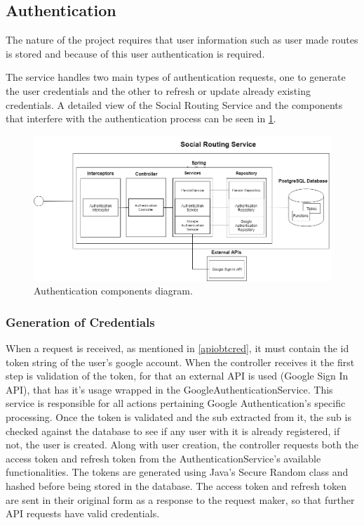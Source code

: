     \subsection{Authentication}

    The nature of the project requires that user information such as user made routes is stored and
    because of this user authentication is required.  

    The service handles two main types of authentication requests, one to generate the user credentials and the other to refresh or update
    already existing credentials. A detailed view of the Social Routing Service and the components that interfere with the authentication process can be seen 
    in \ref{fig:serviceauth}.
    
    \begin{figure}[ht]            
        \includegraphics[width=\textwidth]{images/project-structure/service-auth.PNG} 
        \caption{Authentication components diagram.}
        \label{fig:serviceauth}
    \end{figure}   

    \subsubsection*{Generation of Credentials}
    When a request is received, as mentioned in \ref{apiobtcred}, it must contain the id token string of the user's google account. 
    When the controller receives it the first step is validation of the token, for that an external API is used (Google Sign In API), that has it's usage wrapped 
    in the GoogleAuthenticationService\cite{googleauthservicecode}. This service is responsible for all actions pertaining Google Authentication's specific processing.
    Once the token is validated and the sub extracted from it, the sub is checked against the database to see if any user with it is already registered, if not,
    the user is created. Along with user creation, the controller requests both the access token and refresh token from the AuthenticationService's\cite{authservicecode}
    available functionalities. The tokens are generated using Java's Secure Random class\cite{securerandom} and hashed before being stored in the database. 
    The access token and refresh token are sent in their original form as a response to the request maker, so that further API requests have valid credentials.

